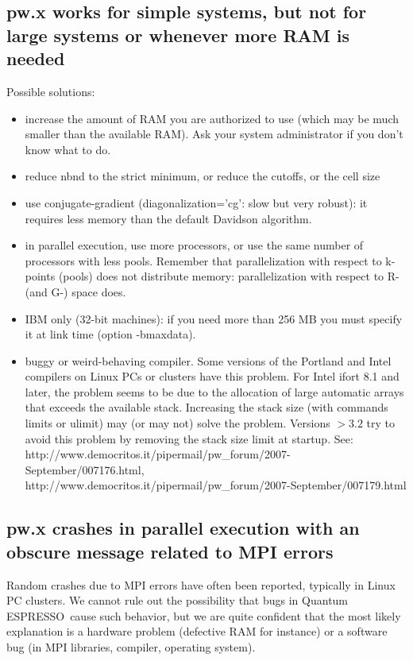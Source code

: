\documentclass[12pt,a4paper]{article}
\def\qe{{\sc Quantum ESPRESSO}}
\begin{document}
\subsection{pw.x works for simple systems, but not for large systems
  or whenever more RAM is needed}  
Possible solutions:
\begin{itemize}
\item increase the amount of RAM you are authorized to use (which may
  be much smaller than the available RAM). Ask your system
  administrator if you don't know what to do.  
\item reduce nbnd to the strict minimum, or reduce the cutoffs, or the
  cell size 
\item  use conjugate-gradient (diagonalization='cg': slow but very
  robust): it requires less memory than the default Davidson
  algorithm. 
\item in parallel execution, use more processors, or use the same
  number of processors with less pools. Remember that parallelization
  with respect to k-points (pools) does not distribute memory:
  parallelization with respect to R- (and G-) space does. 
\item IBM only (32-bit machines): if you need more than 256 MB you
  must specify it at link time (option -bmaxdata). 
\item buggy or weird-behaving compiler. Some versions of the Portland
  and Intel compilers on Linux PCs or clusters have this problem. For
  Intel ifort 8.1 and later, the problem seems to be due to the
  allocation of large automatic arrays that exceeds the available
  stack. Increasing the stack size (with commands limits or ulimit)
  may (or may not) solve the problem. Versions $> 3.2$ try to avoid this
  problem by removing the stack size limit at startup. See:\\
  http://www.democritos.it/pipermail/pw\_forum/2007-September/007176.html,\\
  http://www.democritos.it/pipermail/pw\_forum/2007-September/007179.html 
\end{itemize}

\subsection{pw.x crashes in parallel execution with an obscure message
  related to MPI errors} 
Random crashes due to MPI errors have often been reported, typically
in Linux PC clusters. We cannot rule out the possibility that bugs in
\qe\ cause such behavior, but we are quite confident that
the most likely explanation is a hardware problem (defective RAM  
for instance) or a software bug (in MPI libraries, compiler, operating
system). 
\end{document}
